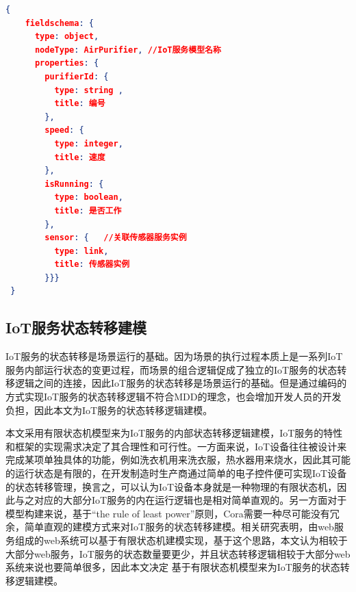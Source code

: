 \documentclass[winfonts,master,twoside]{njuthesis}
\begin{document}


\begin{lstlisting}[caption={coraML定义的净化器服务的设备属性模型},label={lst:airpurifier_device_model},language=json,basicstyle=\footnotesize] 
{
    fieldschema: {
      type: object,
      nodeType: AirPurifier, //IoT服务模型名称
      properties: {
        purifierId: {
          type: string ,
          title: 编号
        },
        speed: {
          type: integer,
          title: 速度
        },
        isRunning: {
          type: boolean,
          title: 是否工作
        },
        sensor: {   //关联传感器服务实例
          type: link,
          title: 传感器实例
        }}}
 }
\end{lstlisting}



\subsection{IoT服务状态转移建模}
IoT服务的状态转移是场景运行的基础。因为场景的执行过程本质上是一系列IoT服务内部运行状态的变更过程，而场景的组合逻辑促成了独立的IoT服务的状态转移逻辑之间的连接，因此IoT服务的状态转移是场景运行的基础。但是通过编码的方式实现IoT服务的状态转移逻辑不符合MDD的理念，也会增加开发人员的开发负担，因此本文为IoT服务的状态转移逻辑建模。

本文采用有限状态机模型来为IoT服务的内部状态转移逻辑建模，IoT服务的特性和框架的实现需求决定了其合理性和可行性。一方面来说，IoT设备往往被设计来完成某项单独具体的功能，例如洗衣机用来洗衣服，热水器用来烧水，因此其可能的运行状态是有限的，在开发制造时生产商通过简单的电子控件便可实现IoT设备的状态转移管理，换言之，可以认为IoT设备本身就是一种物理的有限状态机\cite{drumea2004finite}，因此与之对应的大部分IoT服务的内在运行逻辑也是相对简单直观的。另一方面对于模型构建来说，基于“the rule of least power”原则\cite{theruleofleastpower}，Cora需要一种尽可能没有冗余，简单直观的建模方式来对IoT服务的状态转移建模。相关研究表明，由web服务组成的web系统可以基于有限状态机建模实现\cite{zuzak2011finite}\cite{zuzak2011formal}，基于这个思路，本文认为相较于大部分web服务，IoT服务的状态数量要更少，并且状态转移逻辑相较于大部分web系统来说也要简单很多，因此本文决定
基于有限状态机模型来为IoT服务的状态转移逻辑建模。
\end{document}
